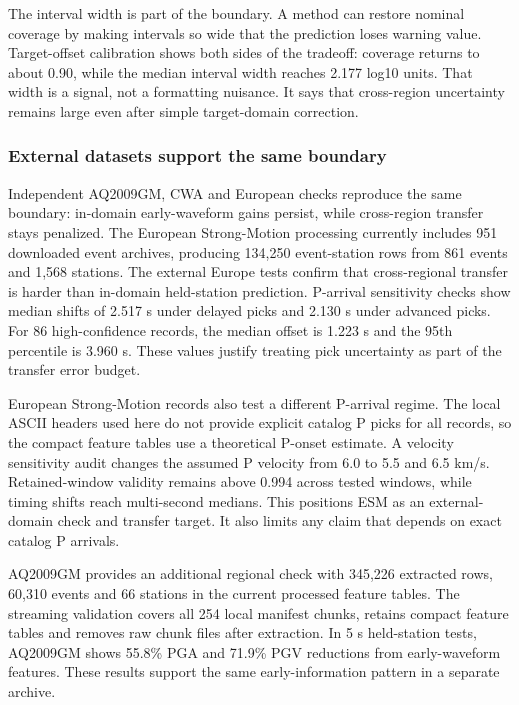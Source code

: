 \documentclass[
  10pt,
]{article}
\begin{document}
The interval width is part of the boundary. A method can restore nominal
coverage by making intervals so wide that the prediction loses warning
value. Target-offset calibration shows both sides of the tradeoff:
coverage returns to about 0.90, while the median interval width reaches
2.177 log10 units. That width is a signal, not a formatting nuisance. It
says that cross-region uncertainty remains large even after simple
target-domain correction.

\subsubsection{External datasets support the same
boundary}\label{external-datasets-support-the-same-boundary}

Independent AQ2009GM, CWA and European checks reproduce the same
boundary: in-domain early-waveform gains persist, while cross-region
transfer stays penalized. The European Strong-Motion processing
currently includes 951 downloaded event archives, producing 134,250
event-station rows from 861 events and 1,568 stations. The external
Europe tests confirm that cross-regional transfer is harder than
in-domain held-station prediction. P-arrival sensitivity checks show
median shifts of 2.517 s under delayed picks and 2.130 s under advanced
picks. For 86 high-confidence records, the median offset is 1.223 s and
the 95th percentile is 3.960 s. These values justify treating pick
uncertainty as part of the transfer error budget.

European Strong-Motion records also test a different P-arrival regime.
The local ASCII headers used here do not provide explicit catalog P
picks for all records, so the compact feature tables use a theoretical
P-onset estimate. A velocity sensitivity audit changes the assumed P
velocity from 6.0 to 5.5 and 6.5 km/s. Retained-window validity remains
above 0.994 across tested windows, while timing shifts reach
multi-second medians. This positions ESM as an external-domain check and
transfer target. It also limits any claim that depends on exact catalog
P arrivals.

AQ2009GM provides an additional regional check with 345,226 extracted
rows, 60,310 events and 66 stations in the current processed feature
tables. The streaming validation covers all 254 local manifest chunks,
retains compact feature tables and removes raw chunk files after
extraction. In 5 s held-station tests, AQ2009GM shows 55.8\% PGA and
71.9\% PGV reductions from early-waveform features. These results
support the same early-information pattern in a separate archive.
\end{document}
